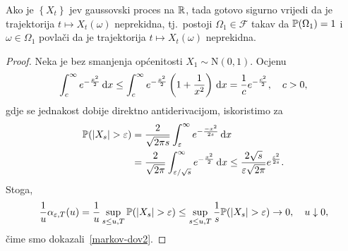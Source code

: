 \documentclass[main.tex]{subfiles}
\begin{document}
\begin{teorem}\label{tm:aditgauss}
	Ako je \( \left\{ X_t \right\} \) \levy jev gaussovski proces na \( \R \), tada gotovo sigurno vrijedi da je trajektorija \( t \mapsto X_t(\omega) \) neprekidna, tj.\ postoji \( \Omega_1 \in \mathcal F \) takav da \( \P(\Omega_1)=1 \) i \( \omega\in \Omega_1\) povlači da je trajektorija \( t \mapsto X_t(\omega) \) neprekidna.
\end{teorem}

\begin{proof}
	Neka je bez smanjenja općenitosti \( X_1 \sim \mathrm N(0,1) \). Ocjenu
	\[
		\int_c^\infty e^{-\frac{x^2}2} \D x \le
		\int_c^\infty e^{-\frac{x^2}2} \left( 1 + \frac 1{x^2} \right) \D x
		= \frac 1c e^{-\frac{c^2}2}, \quad c > 0,
	\]
	gdje se jednakost dobije direktno antiderivacijom, iskoristimo za
	\begin{align}
		\P(\abs{X_s} > \varepsilon) & = \frac 2{\sqrt{2\pi s}} \int_\varepsilon^\infty e^{-\frac{-x^2}{2s}} \D x      \\
		                            & = \frac 2{\sqrt{2 \pi}} \int_{\varepsilon/\sqrt s}^\infty e^{-\frac{x^2}2} \D x
		\le \frac{2 \sqrt s}{\varepsilon \sqrt{2\pi}} e^{\frac{\varepsilon^2}{2s}}.
	\end{align}
	Stoga,
	\begin{equation}
		\frac 1u \alpha_{\varepsilon, T}(u) =
		\frac 1u \sup\limits_{s \le u, T} \P(\abs{X_s} > \varepsilon) \le
		\sup\limits_{s \le u, T} \frac 1s \P(\abs{X_s} > \varepsilon) \un, \quad u \downarrow 0,
	\end{equation}
	čime smo dokazali~\eqref{markov-dov2}.
\end{proof}
\end{document}
